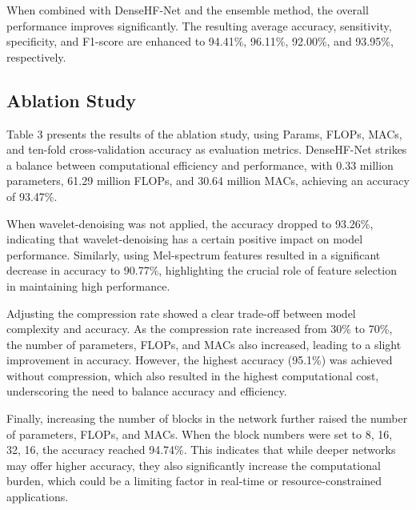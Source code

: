When combined with DenseHF-Net and the ensemble method, the overall performance improves significantly. The resulting average accuracy, sensitivity, specificity, and F1-score are enhanced to 94.41\%, 96.11\%, 92.00\%, and 93.95\%, respectively.
\subsection{Ablation Study}
Table 3 presents the results of the ablation study, using Params, FLOPs, MACs, and ten-fold cross-validation accuracy as evaluation metrics. 
DenseHF-Net strikes a balance between computational efficiency and performance, with 0.33 million parameters, 61.29 million FLOPs, and 30.64 million MACs, achieving an accuracy of 93.47\%.

When wavelet-denoising was not applied, the accuracy dropped to 93.26\%, indicating that wavelet-denoising has a certain positive impact on model performance. Similarly, using Mel-spectrum features resulted in a significant decrease in accuracy to 90.77\%, highlighting the crucial role of feature selection in maintaining high performance.

Adjusting the compression rate showed a clear trade-off between model complexity and accuracy. As the compression rate increased from 30\% to 70\%, the number of parameters, FLOPs, and MACs also increased, leading to a slight improvement in accuracy. However, the highest accuracy (95.1\%) was achieved without compression, which also resulted in the highest computational cost, underscoring the need to balance accuracy and efficiency.

Finally, increasing the number of blocks in the network further raised the number of parameters, FLOPs, and MACs. When the block numbers were set to 8, 16, 32, 16, the accuracy reached 94.74\%. This indicates that while deeper networks may offer higher accuracy, they also significantly increase the computational burden, which could be a limiting factor in real-time or resource-constrained applications.

